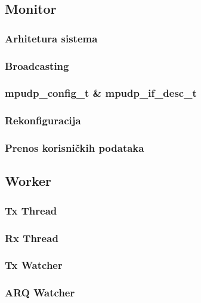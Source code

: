 \documentclass{beamer}
\begin{document}
    \subsection{Monitor}
    \begin{frame}
        \frametitle{Arhitetura sistema}
    \end{frame}

    \begin{frame}
        \frametitle{Broadcasting}
    \end{frame}

    \begin{frame}
        \frametitle{mpudp\_config\_t \& mpudp\_if\_desc\_t}
    \end{frame}

    \begin{frame}
        \frametitle{Rekonfiguracija}
    \end{frame}

    \begin{frame}
        \frametitle{Prenos korisničkih podataka}

    \end{frame}

    \subsection{Worker}
    \begin{frame}
        \frametitle{Tx Thread}
    \end{frame}

    \begin{frame}
        \frametitle{Rx Thread}
    \end{frame}

    \begin{frame}
        \frametitle{Tx Watcher}
    \end{frame}

    \begin{frame}
        \frametitle{ARQ Watcher}
    \end{frame}
\end{document}
